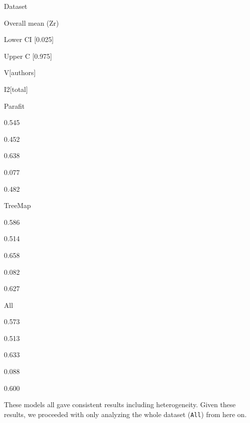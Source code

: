 \documentclass[
]{article}
\begin{document}
Dataset

Overall mean (Zr)

Lower CI {[}0.025{]}

Upper C {[}0.975{]}

V{[}authors{]}

I2{[}total{]}

Parafit

0.545

0.452

0.638

0.077

0.482

TreeMap

0.586

0.514

0.658

0.082

0.627

All

0.573

0.513

0.633

0.088

0.600

These models all gave consistent results including heterogeneity. Given
these results, we proceeded with only analyzing the whole dataset
(\texttt{All}) from here on.
\end{document}
